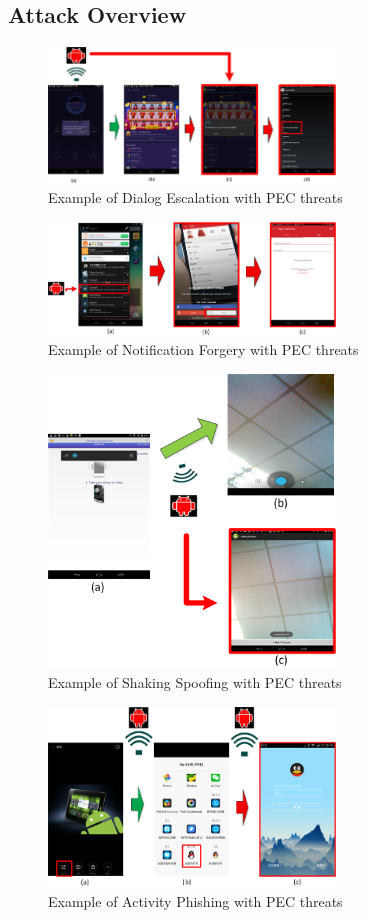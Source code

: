 \documentclass{sig-alternate-05-2015}
\begin{document}
\subsection{Attack Overview}

\begin{figure}
\centering
\includegraphics[width = 3.0in]{pic2.png}
\caption{\label{}Example of Dialog Escalation with PEC threats}
\end{figure}

\begin{figure}
\centering
\includegraphics[width = 3.0in]{pic3.png}
\caption{\label{}Example of Notification Forgery with PEC threats}
\end{figure}

\begin{figure}
\centering
\includegraphics[width = 3.0in]{pic4.png}
\caption{\label{}Example of Shaking Spoofing with PEC threats}
\end{figure}

\begin{figure}
\centering
\includegraphics[width = 3.0in]{pic5.png}
\caption{\label{}Example of Activity Phishing with PEC threats}
\end{figure}
\end{document}
